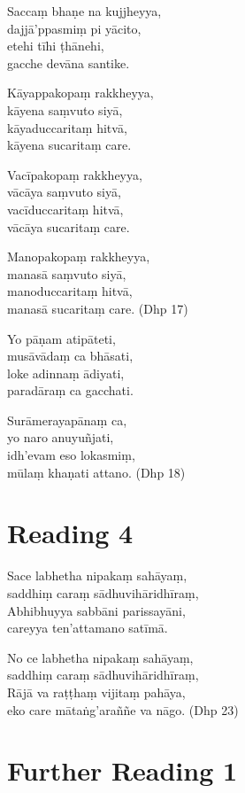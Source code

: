 Saccaṃ bhaṇe na kujjheyya,\\
dajjā’ppasmiṃ pi yācito,\\
etehi tīhi ṭhānehi,\\
gacche devāna santike.

Kāyappakopaṃ rakkheyya,\\
kāyena saṃvuto siyā,\\
kāyaduccaritaṃ hitvā,\\
kāyena sucaritaṃ care.

Vacīpakopaṃ rakkheyya,\\
vācāya saṃvuto siyā,\\
vacīduccaritaṃ hitvā,\\
vācāya sucaritaṃ care.

Manopakopaṃ rakkheyya,\\
manasā saṃvuto siyā,\\
manoduccaritaṃ hitvā,\\
manasā sucaritaṃ care. (Dhp 17)

Yo pāṇam atipāteti,\\
musāvādaṃ ca bhāsati,\\
loke adinnaṃ ādiyati,\\
paradāraṃ ca gacchati.

Surāmerayapānaṃ ca,\\
yo naro anuyuñjati,\\
idh’evam eso lokasmiṃ,\\
mūlaṃ khaṇati attano. (Dhp 18)

\section*{Reading 4}

Sace labhetha nipakaṃ sahāyaṃ,\\
saddhiṃ caraṃ sādhuvihāridhīraṃ,\\
Abhibhuyya sabbāni parissayāni,\\
careyya ten’attamano satīmā.

No ce labhetha nipakaṃ sahāyaṃ,\\
saddhiṃ caraṃ sādhuvihāridhīraṃ,\\
Rājā va raṭṭhaṃ vijitaṃ pahāya,\\
eko care mātaṅg’araññe va nāgo. (Dhp 23)

\section*{Further Reading 1}

